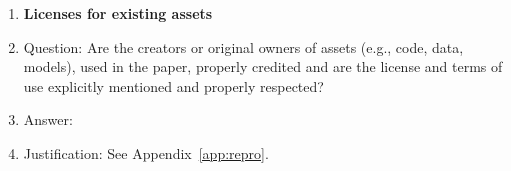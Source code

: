 \begin{enumerate}
\item {\bf Licenses for existing assets}
    \item[] Question: Are the creators or original owners of assets (e.g., code, data, models), used in the paper, properly credited and are the license and terms of use explicitly mentioned and properly respected?
    \item[] Answer: \answerYes{} 
    \item[] Justification: See Appendix~\ref{app:repro}.


\end{enumerate}
